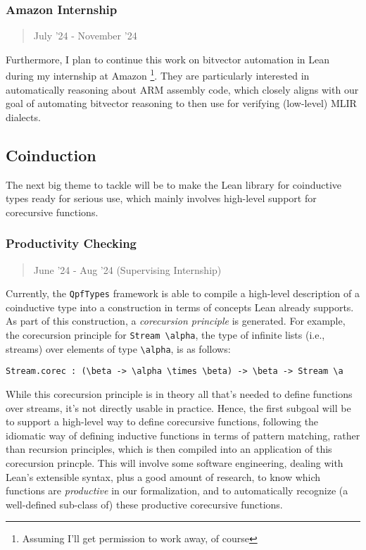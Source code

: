 \documentclass[a4paper]{scrartcl}
\begin{document}
\subsubsection{Amazon Internship}\label{amazon-internship}

\begin{quote}
July '24 - November '24
\end{quote}

Furthermore, I plan to continue this work on bitvector automation in
Lean during my internship at Amazon \footnote{ Assuming I'll get
  permission to work away, of course}. They are particularly interested
in automatically reasoning about ARM assembly code, which closely aligns
with our goal of automating bitvector reasoning to then use for
verifying (low-level) MLIR dialects.

\subsection{Coinduction}\label{coinduction}

The next big theme to tackle will be to make the Lean library for
coinductive types ready for serious use, which mainly involves
high-level support for corecursive functions.


\subsubsection{Productivity Checking}\label{productivity-checking}

\begin{quote}
June '24 - Aug '24 (Supervising Internship)
\end{quote}

Currently, the \texttt{QpfTypes} framework is able to compile a
high-level description of a coinductive type into a construction in
terms of concepts Lean already supports. As part of this construction, a
\emph{corecursion principle} is generated. For example, the corecursion
principle for \texttt{Stream\ \textbackslash{}alpha}, the type of
infinite lists (i.e., streams) over elements of type
\texttt{\textbackslash{}alpha}, is as follows:

\begin{verbatim}
Stream.corec : (\beta -> \alpha \times \beta) -> \beta -> Stream \a
\end{verbatim}

While this corecursion principle is in theory all that's needed to
define functions over streams, it's not directly usable in practice.
Hence, the first subgoal will be to support a high-level way to define
corecursive functions, following the idiomatic way of defining inductive
functions in terms of pattern matching, rather than recursion
principles, which is then compiled into an application of this
corecursion princple. This will involve some software engineering,
dealing with Lean's extensible syntax, plus a good amount of research,
to know which functions are \emph{productive} in our formalization, and
to automatically recognize (a well-defined sub-class of) these
productive corecursive functions.
\end{document}
